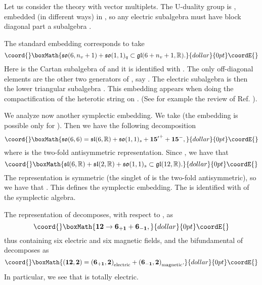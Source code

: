 \documentclass[a4paper,12pt]{article}
\begin{document}
Let us consider the \coordHE{} theory with \coordHE{} vector multiplets.
The U-duality group is \coordHE{},
embedded  (in different ways) in  \coordHE{}, so any
electric subalgebra must have block diagonal part a subalgebra
\coordHE{}.


\bigskip


The standard embedding corresponds to take
$$\coord{}\boxMath{\fso(6,n_v+1)+\fso(1,1)_q\subset \fgl(6+n_v+1,\R).}{dollar}{0pt}\coordE{}$$
 Here
\coordHE{} is the Cartan subalgebra of \coordHE{} and it is
identified with \coordHE{}. The only off-diagonal elements are
the other two generators of \coordHE{}, say \coordHE{}. The
electric subalgebra is then the lower triangular subalgebra
\coordHE{}. This embedding
appears when doing the  compactification of the heterotic string
on \coordHE{}. (See for example the review of Ref. \cite{gpr}).

\bigskip


We analyze now another symplectic embedding. We take  \coordHE{} (the
embedding is possible only for \coordHE{}). Then we have the
following decomposition
 $$\coord{}\boxMath{\fso(6,6)=
\fsl(6,\R)+ \fso(1,1)_s+\mathbf{{15'}^+}+\mathbf{{15}^-}, }{dollar}{0pt}\coordE{}$$ where
\coordHE{} is the two-fold antisymmetric representation. Since
\coordHE{}, we have that
$$\coord{}\boxMath{\fsl(6,\R)+\fsl(2,\R)+\fso(1,1)_s\subset \fgl(12,\R).}{dollar}{0pt}\coordE{}$$ The
representation \coordHE{} is symmetric (the
singlet of \coordHE{} is the two-fold antisymmetric), so we have
that \coordHE{}. This
defines the symplectic embedding. The \coordHE{} is identified
with \coordHE{} of the symplectic algebra.


 The representation \coordHE{} of
\coordHE{} decomposes, with respect to \coordHE{},
as $$\coord{}\boxMath{\mathbf{12}\rightarrow \mathbf{6_{+1}}+\mathbf{6_{-1}},}{dollar}{0pt}\coordE{}$$
thus containing six electric and six magnetic fields, and the
bifundamental of \coordHE{} decomposes as
$$\coord{}\boxMath{\mathbf{(12,2)}=\mathbf{(6_{+1},2)}_{\mathrm{electric}}+\mathbf{(6_{-1},2)}_{\mathrm{magnetic}}.}{dollar}{0pt}\coordE{}$$
In particular, we see that \coordHE{} is totally electric.
\end{document}

